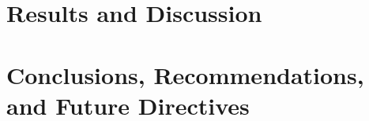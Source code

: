 %
%
%
%
%

\ifResultDiscuss 
	\chapter{Results and Discussion} 
	\label{ch:result_discuss} 
	\startcontents[chapters]
	\begin{SingleSpace}	
		\Mprintcontents 
	\end{SingleSpace}
	
	\stopcontents[chapters]
	\cleardoublepage
\fi

\ifConc
	\chapter{Conclusions, Recommendations, and Future Directives} 
	\label{ch:conc} 
	\startcontents[chapters]
	\begin{SingleSpace}	
		\Mprintcontents 
	\end{SingleSpace}
	
	\stopcontents[chapters]
	\cleardoublepage
\fi

